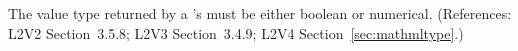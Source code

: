 The value type returned by a \FunctionDefinition's  must be
either boolean or numerical.  (References: L2V2 Section~3.5.8;
L2V3 Section~3.4.9; L2V4 Section~\ref{sec:mathmltype}.)
